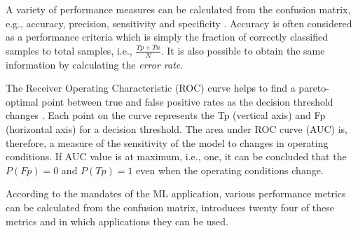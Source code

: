 A variety of performance measures can be calculated from the confusion matrix, e.g., accuracy, precision, sensitivity and specificity \cite{Bradley1997}. Accuracy is often considered as a performance criteria which is simply the fraction of correctly classified samples to total samples, i.e., {\large $\frac{Tp + Tn}{N}$}. It is also possible to obtain the same information by calculating the \textit{error rate}.

The Receiver Operating Characteristic (ROC) curve helps to find a pareto-optimal point between true and false positive rates as the decision threshold changes \cite{Bradley1997}. Each point on the curve represents the Tp (vertical axis) and Fp (horizontal axis) for a decision threshold. The area under ROC curve (AUC) is, therefore, a measure of the sensitivity of the model to changes in operating conditions. If AUC value is at maximum, i.e., one, it can be concluded that the $P(Fp) = 0$ and $P(Tp) = 1$ even when the operating conditions change.

According to the mandates of the ML application, various performance metrics can be calculated from the confusion matrix, \cite{Sokolva2008} introduces twenty four of these metrics and in which applications they can be used.
